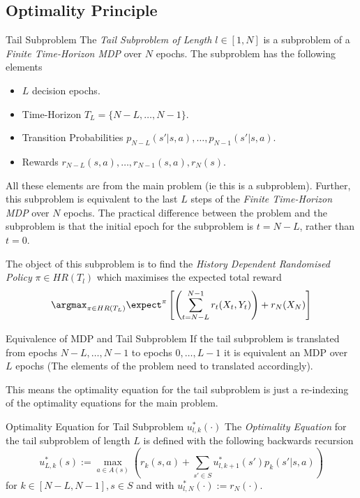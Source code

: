 \documentclass[11pt,a4paper]{article}
\begin{document}
\subsection*{Optimality Principle}

  \begin{definition}{Tail Subproblem}
    The \textit{Tail Subproblem of Length $l\in[1,N]$} is a subproblem of a \textit{Finite Time-Horizon MDP} over $N$ epochs. The subproblem has the following elements
    \begin{itemize}
      \item $L$ decision epochs.
      \item Time-Horizon $T_L=\{N-L,\dots,N-1\}$.
      \item Transition Probabilities $p_{N-L}(s'|s,a),\dots,p_{N-1}(s'|s,a)$.
      \item Rewards $r_{N-L}(s,a),\dots,r_{N-1}(s,a),r_{N}(s)$.
    \end{itemize}
    All these elements are from the main problem (ie this is a subproblem). Further, this subproblem is equivalent to the last $L$ steps of the \textit{Finite Time-Horizon MDP} over $N$ epochs. The practical difference between the problem and the subproblem is that the initial epoch for the subproblem is $t=N-L$, rather than $t=0$.
    \par The object of this subproblem is to find the \textit{History Dependent Randomised Policy} $\pi\in HR(T_l)$ which maximises the expected total reward
    \[ \argmax_{\pi\in HR(T_L)}\expect^\pi\left[\left(\sum_{t=N-L}^{N-1}r_t(X_t,Y_t)\right)+r_N(X_N)\right] \]
  \end{definition}

  \begin{remark}{Equivalence of MDP and Tail Subproblem}
    If the tail subproblem is translated from epochs $N-L,\dots,N-1$ to epochs $0,\dots,L-1$ it is equivalent an MDP over $L$ epochs (The elements of the problem need to translated accordingly).
    \par This means the optimality equation for the tail subproblem is just a re-indexing of the optimality equations for the main problem.
  \end{remark}

  \begin{proposition}{Optimality Equation for Tail Subproblem $u_{l,k}^*(\cdot)$}
    The \textit{Optimality Equation} for the tail subproblem of length $L$ is defined with the following backwards recursion
    \[ u_{L,k}^*(s):=\max_{a\in A(s)}\left(r_k(s,a)+\sum_{s'\in S}u_{l,k+1}^*(s')p_k(s'|s,a)\right) \]
    for $k\in[N-L,N-1],s\in S$ and with $u_{l,N}^*(\cdot):=r_N(\cdot)$.
  \end{proposition}
\end{document}
